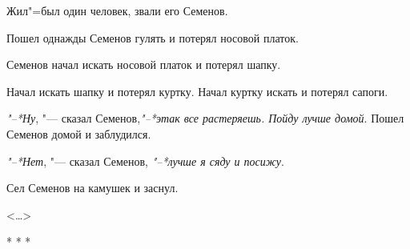 Жил"=был один человек, звали его Семенов.

Пошел однажды Семенов гулять и потерял носовой платок.

Семенов начал искать носовой платок и потерял шапку.

Начал искать шапку и потерял куртку. Начал куртку искать и потерял сапоги.

\textit{"--*Ну}, "--- сказал Семенов,\textit{"--*этак все растеряешь. Пойду лучше домой}. Пошел Семенов домой и заблудился.

\textit{"--*Нет}, "--- сказал Семенов, \textit{"--*лучше я сяду и посижу}.

Сел Семенов на камушек и заснул.

\begin{flushright}
<\dots{}>
\end{flushright}

\begin{center}
* * * 
\end{center}
